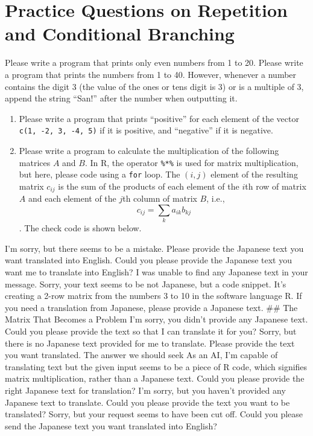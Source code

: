\documentclass[
  a4paper,
]{book}
\providecommand{\tightlist}{%
  \setlength{\itemsep}{0pt}\setlength{\parskip}{0pt}}\usepackage{longtable,booktabs,array}
\begin{document}
\section{Practice Questions on Repetition and Conditional
Branching}\label{practice-questions-on-repetition-and-conditional-branching}

Please write a program that prints only even numbers from 1 to 20.
Please write a program that prints the numbers from 1 to 40. However,
whenever a number contains the digit 3 (the value of the ones or tens
digit is 3) or is a multiple of 3, append the string ``San!'' after the
number when outputting it.

\begin{enumerate}
\def\labelenumi{\arabic{enumi}.}
\setcounter{enumi}{2}
\tightlist
\item
  Please write a program that prints ``positive'' for each element of
  the vector \texttt{c(1,\ -2,\ 3,\ -4,\ 5)} if it is positive, and
  ``negative'' if it is negative.
\item
  Please write a program to calculate the multiplication of the
  following matrices \(A\) and \(B\). In R, the operator \texttt{\%*\%}
  is used for matrix multiplication, but here, please code using a
  \texttt{for} loop. The \((i,j)\) element of the resulting matrix
  \(c_{ij}\) is the sum of the products of each element of the \(i\)th
  row of matrix \(A\) and each element of the \(j\)th column of matrix
  \(B\), i.e., \[c_{ij}=\sum_{k} a_{ik}b_{kj}\]. The check code is shown
  below.
\end{enumerate}

I'm sorry, but there seems to be a mistake. Please provide the Japanese
text you want translated into English. Could you please provide the
Japanese text you want me to translate into English? I was unable to
find any Japanese text in your message. Sorry, your text seems to be not
Japanese, but a code snippet. It's creating a 2-row matrix from the
numbers 3 to 10 in the software language R. If you need a translation
from Japanese, please provide a Japanese text. \#\# The Matrix That
Becomes a Problem I'm sorry, you didn't provide any Japanese text. Could
you please provide the text so that I can translate it for you? Sorry,
but there is no Japanese text provided for me to translate. Please
provide the text you want translated. The answer we should seek As an
AI, I'm capable of translating text but the given input seems to be a
piece of R code, which signifies matrix multiplication, rather than a
Japanese text. Could you please provide the right Japanese text for
translation? I'm sorry, but you haven't provided any Japanese text to
translate. Could you please provide the text you want to be translated?
Sorry, but your request seems to have been cut off. Could you please
send the Japanese text you want translated into English?
\end{document}
